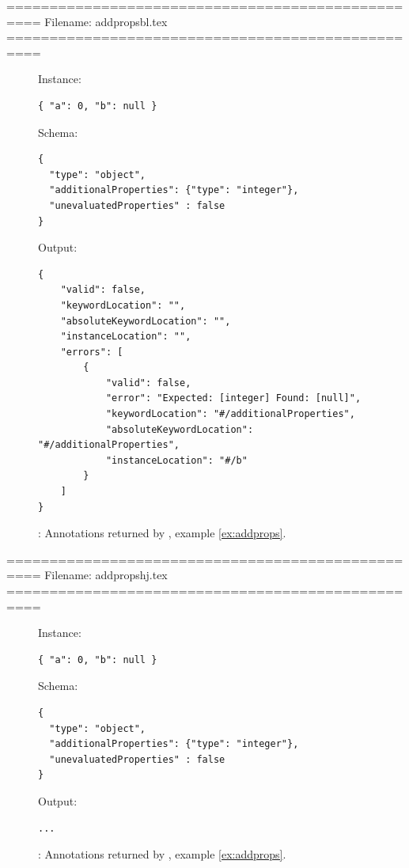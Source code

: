
==================================================
Filename: addpropsbl.tex
==================================================
\begin{figure}
\small

Instance:
\begin{querybox}{}
\begin{lstlisting}[style=querynonumbers]
{ "a": 0, "b": null }
\end{lstlisting}
\end{querybox}


Schema:
\begin{querybox}{}
\begin{lstlisting}[style=query]
{
  "type": "object",
  "additionalProperties": {"type": "integer"},
  "unevaluatedProperties" : false
}
\end{lstlisting}
\end{querybox}


Output:
\begin{querybox}{}
\begin{lstlisting}[style=query]
{
	"valid": false,
	"keywordLocation": "",
	"absoluteKeywordLocation": "",
	"instanceLocation": "",
	"errors": [
		{
			"valid": false,
			"error": "Expected: [integer] Found: [null]",
			"keywordLocation": "#/additionalProperties",
			"absoluteKeywordLocation": "#/additionalProperties",
			"instanceLocation": "#/b"
		}
	]
}
\end{lstlisting}
\end{querybox}

\caption{{\qunProps}: Annotations returned by {\BL}, example \ref{ex:addprops}.}
\label{fig:addpropsbl}
\end{figure}






==================================================
Filename: addpropshj.tex
==================================================
\begin{figure}
\small

Instance:
\begin{querybox}{}
\begin{lstlisting}[style=querynonumbers]
{ "a": 0, "b": null }
\end{lstlisting}
\end{querybox}

Schema:
\begin{querybox}{}
\begin{lstlisting}[style=query]
{
  "type": "object",
  "additionalProperties": {"type": "integer"},
  "unevaluatedProperties" : false
}
\end{lstlisting}
\end{querybox}

Output:
\begin{querybox}{}
\begin{lstlisting}[style=query]
...
\end{lstlisting}
\end{querybox}
\caption{{\qunProps}: Annotations returned by {\HJ}, example \ref{ex:addprops}.}
\label{fig:addpropshj}
\end{figure}


